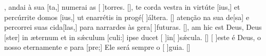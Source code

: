 {        {, andai à sua [ta,] numerai as [ ]{tor}res. [\LinkPT]},
    {te corda vestra in virtúte [ius,] et percúrrite domos [ius,] ut enarrétis in progé[ ]{ál}tera. [\LinkLA]}%
        { atenção na sua de[sa] e percorrei suas cida\-[\-las,] para narrardes às gera[ ]{fu}{tu}ras. [\LinkPT]},
    {am hic est Deus, Deus [ster] in æternum et in sǽculum [culi:] ipse ducet [ ]{in}[ ]{sǽ}cula. [\LinkLA]}%
        {[ ]{es}te é Deus, o nosso  eternamente e para [\-pre;] Ele será sempre o [ ]{gui}a. [\LinkPT]}
}